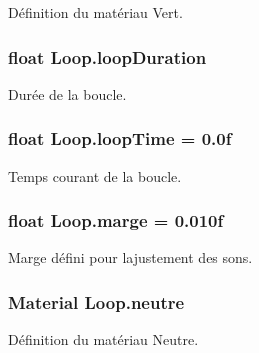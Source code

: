 Définition du matériau Vert. 

\hypertarget{class_loop_a5b85a1c3af3975aab929058d084929f0}{}
\subsubsection[{loop\+Duration}]{\setlength{\rightskip}{0pt plus 5cm}float Loop.\+loop\+Duration\hspace{0.3cm}{\ttfamily [private]}}\label{class_loop_a5b85a1c3af3975aab929058d084929f0}


Durée de la boucle. 

\hypertarget{class_loop_ab6f3df1dceea6e92a1728d8ad3558f4b}{}
\subsubsection[{loop\+Time}]{\setlength{\rightskip}{0pt plus 5cm}float Loop.\+loop\+Time = 0.\+0f\hspace{0.3cm}{\ttfamily [private]}}\label{class_loop_ab6f3df1dceea6e92a1728d8ad3558f4b}


Temps courant de la boucle. 

\hypertarget{class_loop_a0db6a9a6439342876ec7eee9acf3a4bd}{}
\subsubsection[{marge}]{\setlength{\rightskip}{0pt plus 5cm}float Loop.\+marge = 0.\+010f\hspace{0.3cm}{\ttfamily [private]}}\label{class_loop_a0db6a9a6439342876ec7eee9acf3a4bd}


Marge défini pour l\textquotesingle{}ajustement des sons. 

\hypertarget{class_loop_ae76c0e46e59d56e3b602d597bceae38e}{}
\subsubsection[{neutre}]{\setlength{\rightskip}{0pt plus 5cm}Material Loop.\+neutre\hspace{0.3cm}{\ttfamily [private]}}\label{class_loop_ae76c0e46e59d56e3b602d597bceae38e}


Définition du matériau Neutre. 

